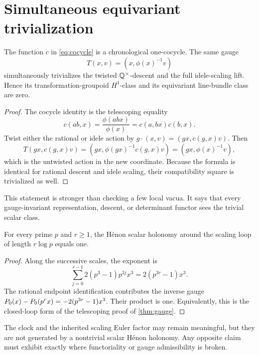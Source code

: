 \section{Simultaneous equivariant trivialization}

\begin{theorem}\label{thm:gauge}
The function \(c\) in \eqref{eq:cocycle} is a chronological one-cocycle.
The same gauge
\begin{equation}\label{eq:gauge}
  T(x,v)=(x,\phi(x)^{-1}v)
\end{equation}
simultaneously trivializes the twisted \(\mathbb{Q}^\times\)-descent and the full
idele-scaling lift.  Hence its transformation-groupoid \(H^1\)-class and
its equivariant line-bundle class are zero.
\end{theorem}

\begin{proof}
The cocycle identity is the telescoping equality
\[
  c(ab,x)=\frac{\phi(abx)}{\phi(x)}
  =c(a,bx)c(b,x).
\]
Twist either the rational or idele action by
\(g\cdot(x,v)=(gx,c(g,x)v)\).  Then
\[
  T(gx,c(g,x)v)
  =(gx,\phi(gx)^{-1}c(g,x)v)
  =(gx,\phi(x)^{-1}v),
\]
which is the untwisted action in the new coordinate.  Because the formula
is identical for rational descent and idele scaling, their compatibility
square is trivialized as well.
\end{proof}

This statement is stronger than checking a few local vacua.  It says that
every gauge-invariant representation, descent, or determinant functor sees
the trivial scalar class.

\begin{corollary}\label{cor:prime}
For every prime \(p\) and \(r\ge1\), the H\'enon scalar holonomy around the
scaling loop of length \(r\log p\) equals one.
\end{corollary}

\begin{proof}
Along the successive scales, the exponent is
\[
  \sum_{j=0}^{r-1}2(p^3-1)p^{3j}x^3
  =2(p^{3r}-1)x^3.
\]
The rational endpoint identification contributes the inverse gauge
\(P_0(x)-P_0(p^rx)=-2(p^{3r}-1)x^3\).  Their product is one.  Equivalently,
this is the closed-loop form of the telescoping proof of
\cref{thm:gauge}.
\end{proof}

The clock and the inherited scaling Euler factor may remain meaningful,
but they are not generated by a nontrivial scalar H\'enon holonomy.  Any
opposite claim must exhibit exactly where functoriality or gauge
admissibility is broken.
